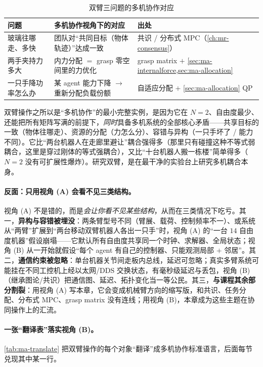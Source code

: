\begin{table}[H]\centering\small
\caption{双臂三问题的多机协作对应}
\label{tab:ma-translate-q}
\begin{tabular}{lll}
\toprule
问题 & 多机协作视角下的对应 & 出处 \\
\midrule
玻璃往哪走、多快 & 团队对“共同目标（物体轨迹）”达成一致 & 共识 / 分布式 MPC（\cref{ch:mr-consensus}） \\
两手夹持力多大 & 内力分配 $=$ grasp 零空间里的力优化 & grasp matrix $+$ \cref{sec:ma-internalforce,sec:ma-allocation} \\
一只手降功率怎么办 & 某 agent 能力下降 $\to$ 重新分配负载份额 & 自适应分配 $+$ \cref{sec:ma-allocation} QP \\
\bottomrule
\end{tabular}
\end{table}

\begin{insight}[双臂是多机耦合的最小完整实例]
双臂操作之所以是“多机协作”的最小完整实例，是因为它在 $N=2$、自由度最少、还能把所有矩阵写满的前提下，\emph{同时}具备多机系统的全部核心矛盾——共享目标的一致（物体往哪走）、资源的分配（力怎么分）、容错与异构（一只手坏了 / 能力不同）。它比“两台机器人在走廊里避让”耦合强得多（那里只有碰撞这种不等式弱耦合，这里是穿过刚体的等式强耦合），又比“十台机器人搬一栋楼”简单得多（$N=2$ 没有可扩展性爆炸）。研究双臂，是在最干净的实验台上研究多机耦合本身。
\end{insight}

\paragraph{反面：只用视角 (A) 会看不见三类结构。}
视角 (A) 不是错的，而是\emph{会让你看不见某些结构}，从而在三类情况下吃亏。其一，\textbf{异构与容错被埋没}：两条臂型号不同（臂展、载荷、控制频率不一）、或系统从“两臂”扩展到“两台移动双臂机器人各出一只手”时，视角 (A) 的“一台 $14$ 自由度机器”假设崩塌——它默认所有自由度共享同一个时钟、求解器、全局状态；视角 (B) 从一开始就假设“每个 agent 有自己的控制器、只能观测局部 $+$ 邻居”。其二，\textbf{通信约束被忽略}：单台机器关节间走板内总线，延迟可忽略；真实多臂系统可能挂在不同工控机上经以太网/DDS 交换状态，有毫秒级延迟与丢包，视角 (B)（继承图论/共识）把通信图、延迟、拓扑变化当一等公民。其三，\textbf{与课程其余部分割裂}：用视角 (A) 写本章，它会变成机械臂方向的缩写版，和共识、任务分配、分布式 MPC、grasp matrix 没有连线；用视角 (B)，本章成为这些主题在协同操作上的汇流。

\paragraph{一张“翻译表”落实视角 (B)。}
\cref{tab:ma-translate} 把双臂操作的每个对象“翻译”成多机协作标准语言，后面每节兑现其中某一行。

